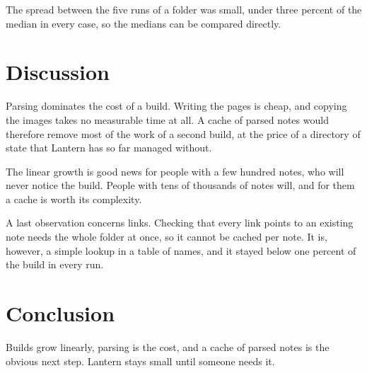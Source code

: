 \documentclass[12pt]{article}
\begin{document}
The spread between the five runs of a folder was small, under three
percent of the median in every case, so the medians can be compared
directly.

\section{Discussion}
\label{sec:discussion}

Parsing dominates the cost of a build. Writing the pages is cheap,
and copying the images takes no measurable time at all. A cache of
parsed notes would therefore remove most of the work of a second
build, at the price of a directory of state that Lantern has so far
managed without.

The linear growth is good news for people with a few hundred notes,
who will never notice the build. People with tens of thousands of
notes will, and for them a cache is worth its complexity.

A last observation concerns links. Checking that every link points to
an existing note needs the whole folder at once, so it cannot be
cached per note. It is, however, a simple lookup in a table of names,
and it stayed below one percent of the build in every run.

\section{Conclusion}
\label{sec:conclusion}

Builds grow linearly, parsing is the cost, and a cache of parsed notes
is the obvious next step. Lantern stays small until someone needs it.

\printbibliography
\end{document}
